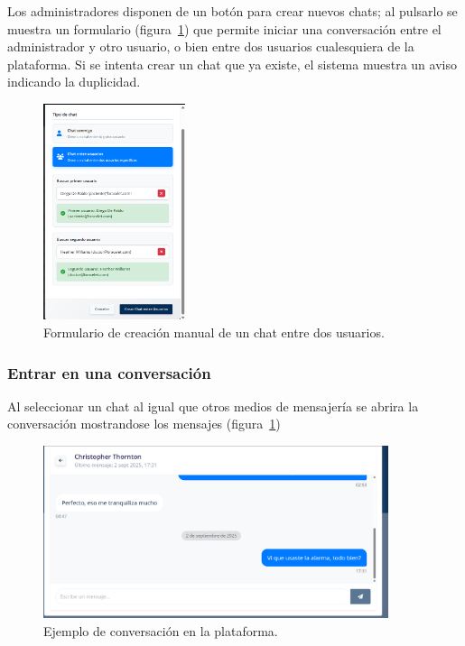 \documentclass[12pt, a4paper]{article}
\begin{document}
\begin{umaappendices}
Los administradores disponen de un botón para crear nuevos chats; al pulsarlo se muestra un formulario (figura~\ref{fig:chat2}) que permite iniciar una conversación entre el administrador y otro usuario, o bien entre dos usuarios cualesquiera de la plataforma. Si se intenta crear un chat que ya existe, el sistema muestra un aviso indicando la duplicidad.
\vspace{-5pt}

\begin{figure}[htbp]
	\centering
	\includegraphics[width=0.37\textwidth]{images/10_chat2.png}
	\caption[Ejemplo]{Formulario de creación manual de un chat entre dos usuarios.}
	\label{fig:chat2}
\end{figure}

	\subsubsection{Entrar en una conversación}
	Al seleccionar un chat al igual que otros medios de mensajería se abrira la conversación mostrandose los mensajes (figura~\ref{fig:chat2})
	
	\begin{figure}[htbp]
		\centering
		\includegraphics[width=0.9\textwidth]{images/11_chati.png}
		\caption[Ejemplo]{Ejemplo de conversación en la plataforma.}
		\label{fig:chati}
	\end{figure}


\end{umaappendices}
\end{document}
